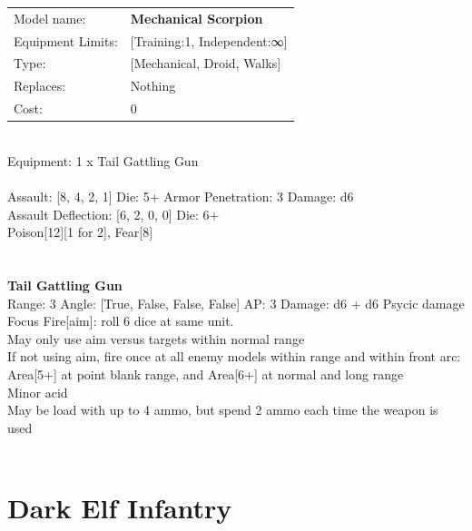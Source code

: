 {\noindent
\begin{tabular}{ll}
Model name: &{\bf Mechanical Scorpion } \\
Equipment Limits: &[Training:1, Independent:∞] \\
Type: &[Mechanical, Droid, Walks] \\
Replaces: &Nothing \\
Cost: & 0\\
\end{tabular}
\ \\
Equipment: 1 x Tail Gattling Gun \\
\ \\
Assault: [8, 4, 2, 1] Die: 5+ Armor Penetration: 3 Damage: d6 \\
Assault Deflection: [6, 2, 0, 0] Die: 6+\\
\indent Poison[12][1 for 2], Fear[8]\\ 
 
\ \\

\ \\
{\bf Tail Gattling Gun } \\



Range: 3  Angle: [True, False, False, False] AP: 3 Damage: d6 + d6 Psycic damage \\
Focus Fire[aim]: roll 6 dice at same unit.\\ 
May only use aim versus targets within normal range\\ 
If not using aim, fire once at all enemy models within range and within front arc: Area[5+] at point blank range, and Area[6+] at normal and long range\\ 
Minor acid\\ 
May be load with up to 4 ammo, but spend 2 ammo each time the weapon is used\\ 




 
\ \\













\clearpage

\section{ Dark Elf Infantry }

}
